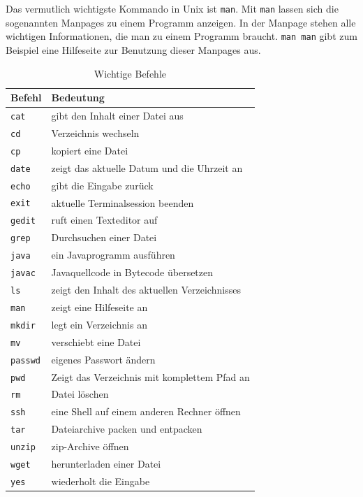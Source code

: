 Das vermutlich wichtigste Kommando in Unix ist \lstinline$man$. Mit \lstinline$man$ lassen sich die sogenannten Manpages zu einem Programm anzeigen. In der Manpage stehen alle wichtigen Informationen, die man zu einem Programm braucht.
\lstinline$man man$ gibt zum Beispiel eine Hilfeseite zur Benutzung dieser Manpages aus.

\begin{table}
\centering
\begin{tabular}{l|l}
Befehl & Bedeutung \\ \hline
\lstinline$cat$ & gibt den Inhalt einer Datei aus \\
\lstinline$cd$ & Verzeichnis wechseln \\
\lstinline$cp$ & kopiert eine Datei \\
\lstinline$date$ & zeigt das aktuelle Datum und die Uhrzeit an \\
\lstinline$echo$ & gibt die Eingabe zurück \\
\lstinline$exit$ & aktuelle Terminalsession beenden \\
\lstinline$gedit$ & ruft einen Texteditor auf \\
\lstinline$grep$ & Durchsuchen einer Datei \\
\lstinline$java$ & ein Javaprogramm ausführen \\
\lstinline$javac$ & Javaquellcode in Bytecode übersetzen \\
\lstinline$ls$ & zeigt den Inhalt des aktuellen Verzeichnisses \\
\lstinline$man$ & zeigt eine Hilfeseite an \\
\lstinline$mkdir$ & legt ein Verzeichnis an \\
\lstinline$mv$ & verschiebt eine Datei \\
\lstinline$passwd$ & eigenes Passwort ändern \\
\lstinline$pwd$ & Zeigt das Verzeichnis mit komplettem Pfad an \\
\lstinline$rm$ & Datei löschen \\
\lstinline$ssh$ & eine Shell auf einem anderen Rechner öffnen \\
\lstinline$tar$ & Dateiarchive packen und entpacken \\
\lstinline$unzip$ & zip-Archive öffnen \\
\lstinline$wget$ & herunterladen einer Datei \\
\lstinline$yes$ & wiederholt die Eingabe
\end{tabular}
\label{Befehle}
\caption{Wichtige Befehle}
\end{table}

